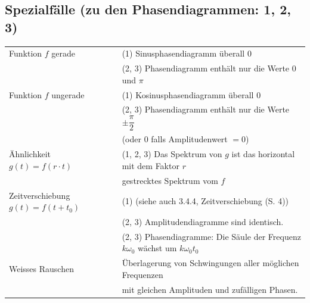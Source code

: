 	\subsection{Spezialfälle (zu den Phasendiagrammen: 1, 2, 3)}
		\begin{tabular}{|l|l|}
			\hline
			Funktion $f$ gerade & (1) Sinusphasendiagramm überall $0$\\[3pt]
			 & (2, 3) Phasendiagramm enthält nur die Werte $0$ und $\pi$\\[3pt]
	 		Funktion $f$ ungerade & (1) Kosinusphasendiagramm überall $0$\\[3pt]
	 		 & (2, 3) Phasendiagramm enthält nur die Werte $\pm \dfrac{\pi}{2}$\\[3pt] 
	 		 & (oder $0$ falls Amplitudenwert $= 0$)\\[3pt]
	 		Ähnlichkeit $g(t) = f(r \cdot t)$ & (1, 2, 3) Das Spektrum von $g$ ist das horizontal mit dem Faktor $r$\\[3pt]
	 		 & gestrecktes Spektrum vom $f$\\[3pt]
	 		Zeitverschiebung $g(t) = f(t + t_0)$ & (1) (siehe auch 3.4.4, Zeitverschiebung (S. 4))\\[3pt]
	 		 & (2, 3) Amplitudendiagramme sind identisch.\\[3pt]
	 		 & (2, 3) Phasendiagramme: Die Säule der Frequenz $k \omega_0$ wächst um $k \omega_0 t_0$\\[3pt]
	 		Weisses Rauschen & Überlagerung von Schwingungen aller möglichen Frequenzen\\[3pt]
	 		 & mit gleichen Amplituden und zufälligen Phasen.\\[3pt]
	 		\hline
		\end{tabular}

